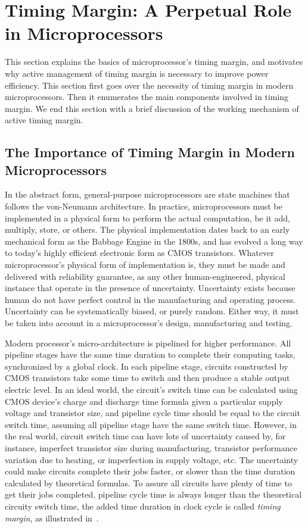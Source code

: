 
\chapter{Timing Margin: A Perpetual Role in Microprocessors}
\label{sec:background}

This section explains the basics of microprocessor's timing margin, and motivates why active management of timing margin is necessary to improve power efficiency. This section first goes over the necessity of timing margin in modern microprocessors. Then it enumerates the main components involved in timing margin. We end this section with a brief discussion of the working mechanism of active timing margin.

\section{The Importance of Timing Margin in Modern Microprocessors}
\label{sec:background:importance}

In the abstract form, general-purpose microprocessors are state machines that follows the von-Neumann architecture. In practice, microprocessors must be implemented in a physical form to perform the actual computation, be it add, multiply, store, or others. The physical implementation dates back to an early mechanical form as the Babbage Engine in the 1800s, and has evolved a long way to today's highly efficient electronic form as CMOS transistors. Whatever microprocessor's physical form of implementation is, they must be made and delivered with reliability guarantee, as any other human-engineered, physical instance that operate in the presence of uncertainty. Uncertainty exists because human do not have perfect control in the manufacturing and operating process. Uncertainty can be systematically biased, or purely random. Either way, it must be taken into account in a microprocessor's design, manufacturing and testing.

Modern processor's micro-architecture is pipelined for higher performance. All pipeline stages have the same time duration to complete their computing tasks, synchronized by a global clock. In each pipeline stage, circuits constructed by CMOS transistors take some time to switch and then produce a stable output electric level. In an ideal world, the circuit's switch time can be calculated using CMOS device's charge and discharge time formula given a particular supply voltage and transistor size, and pipeline cycle time should be equal to the circuit switch time, assuming all pipeline stage have the same switch time. However, in the real world, circuit switch time can have lots of uncertainty caused by, for instance, imperfect transistor size during manufacturing, transistor performance variation due to heating, or imperfection in supply voltage, etc. The uncertainty could make circuits complete their jobs faster, or slower than the time duration calculated by theoretical formulas. To assure all circuits have plenty of time to get their jobs completed, pipeline cycle time is always longer than the theoretical circuity switch time, the added time duration in clock cycle is called \textit{timing margin}, as illustrated in~.

